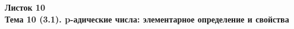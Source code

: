 \documentclass[a4paper, 11pt]{article}
\begin{document}
\begin{center} \Large \bf Листок 10\\ Тема 10 (3.1). p-адические числа: элементарное определение и свойства \end{center}


\end{document}
